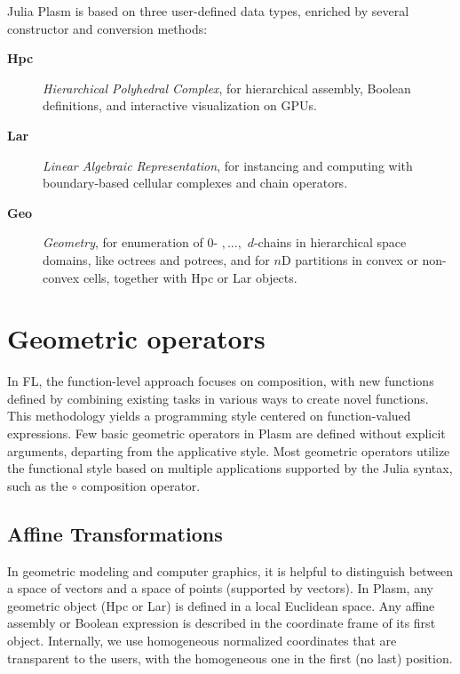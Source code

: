 \documentclass{juliacon}
\begin{document}
Julia Plasm is based on three user-defined data types, enriched by several constructor and conversion methods:
\begin{description}
	\item[\textbf{Hpc}] \emph{Hierarchical Polyhedral Complex}, for hierarchical assembly, Boolean definitions, and interactive visualization on GPUs.
	\item[\textbf{Lar}] \emph{Linear Algebraic Representation}, for instancing and computing with boundary-based  cellular complexes and chain operators.
	\item[\textbf{Geo}] \emph{Geometry}, for enumeration of 0- $,\ldots,$ $d$-chains in hierarchical space domains, like octrees and potrees, and for $n$D partitions in convex or non-convex cells, together with Hpc or Lar objects.
\end{description}


\section{Geometric operators}
\label{sec:additional_faci}

In FL, the function-level approach focuses on composition, with new functions defined by combining existing tasks in various ways to create novel functions. This methodology yields a programming style centered on function-valued expressions. Few basic geometric operators in Plasm are defined without explicit arguments, departing from the applicative style. Most geometric operators utilize the functional style based on multiple applications supported by the Julia syntax, such as the $\circ$ composition operator.



\subsection{Affine Transformations}
\label{subsec:title_auth}

In geometric modeling and computer graphics, it is helpful to distinguish between a space of vectors and a space of points (supported by vectors). In Plasm, any geometric object (Hpc or Lar) is defined in a local Euclidean space. Any affine assembly or Boolean expression is described in the coordinate frame of its first object.  Internally, we use homogeneous normalized coordinates that are transparent to the users, with the homogeneous one in the first (no last) position.
\end{document}
